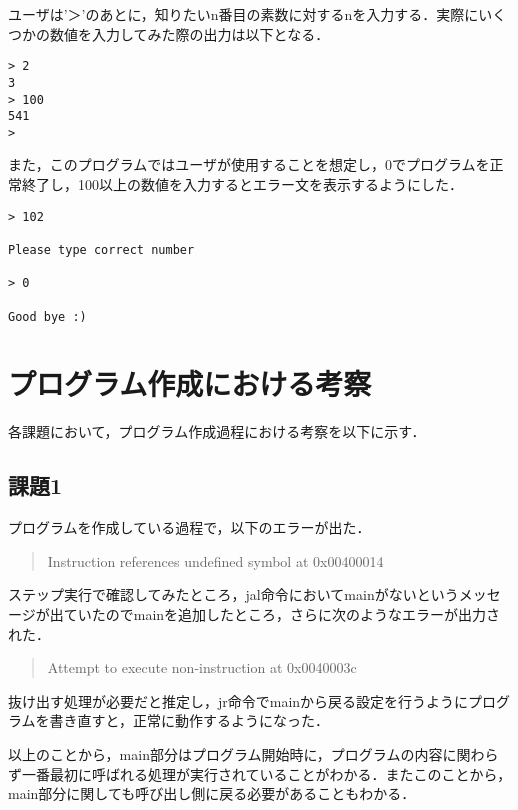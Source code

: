 \documentclass[a4j]{jarticle}
\begin{document}
ユーザは'＞'のあとに，知りたいn番目の素数に対するnを入力する．実際にいくつかの数値を入力してみた際の出力は以下となる．

{\baselineskip 3mm
\begin{verbatim}
> 2
3
> 100
541
> 
\end{verbatim}
}

また，このプログラムではユーザが使用することを想定し，0でプログラムを正常終了し，100以上の数値を入力するとエラー文を表示するようにした．

{\baselineskip 3mm
\begin{verbatim}
> 102

Please type correct number

> 0

Good bye :)
\end{verbatim}
}





%
%

\section{プログラム作成における考察}

各課題において，プログラム作成過程における考察を以下に示す．

\subsection{課題1}

プログラムを作成している過程で，以下のエラーが出た．

\begin{quote}
Instruction references undefined symbol at 0x00400014
\end{quote}

ステップ実行で確認してみたところ，jal命令においてmainがないというメッセージが出ていたのでmainを追加したところ，さらに次のようなエラーが出力された．

\begin{quote}
Attempt to execute non-instruction at 0x0040003c
\end{quote}

抜け出す処理が必要だと推定し，jr命令でmainから戻る設定を行うようにプログラムを書き直すと，正常に動作するようになった．

以上のことから，main部分はプログラム開始時に，プログラムの内容に関わらず一番最初に呼ばれる処理が実行されていることがわかる．またこのことから，main部分に関しても呼び出し側に戻る必要があることもわかる．
\end{document}

